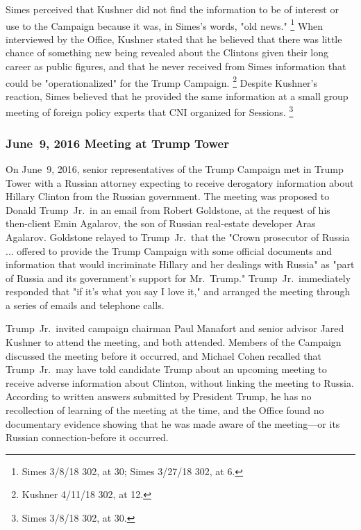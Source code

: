 Simes perceived that Kushner did not find the information to be of interest or use to the Campaign because it was, in Simes's words, "old news."%
\footnote{Simes 3/8/18 302, at 30;
Simes 3/27/18 302, at 6.}
When interviewed by the Office, Kushner stated that he believed that there was little chance of something new being revealed about the Clintons given their long career as public figures, and that he never received from Simes information that could be "operationalized" for the Trump Campaign.%
\footnote{Kushner 4/11/18 302, at 12.}
Despite Kushner's reaction, Simes believed that he provided the same information at a small group meeting of foreign policy experts that CNI organized for Sessions.%
\footnote{Simes 3/8/18 302, at 30.}

\subsubsection{June~9, 2016 Meeting at Trump Tower}

On June~9, 2016, senior representatives of the Trump Campaign met in Trump Tower with a Russian attorney expecting to receive derogatory information about Hillary Clinton from the Russian government.
The meeting was proposed to Donald Trump~Jr.\ in an email from Robert Goldstone, at the request of his then-client Emin Agalarov, the son of Russian real-estate developer Aras Agalarov.
Goldstone relayed to Trump~Jr.\ that the "Crown prosecutor of Russia ... offered to provide the Trump Campaign with some official documents and information that would incriminate Hillary and her dealings with Russia" as "part of Russia and its government's support for Mr.~Trump."
Trump~Jr.\ immediately responded that "if it's what you say I love it," and arranged the meeting through a series of emails and telephone calls.

Trump~Jr.\ invited campaign chairman Paul Manafort and senior advisor Jared Kushner to attend the meeting, and both attended.
Members of the Campaign discussed the meeting before it occurred, and Michael Cohen recalled that Trump~Jr.\ may have told candidate Trump about an upcoming meeting to receive adverse information about Clinton, without linking the meeting to Russia.
According to written answers submitted by President Trump, he has no recollection of learning of the meeting at the time, and the Office found no documentary evidence showing that he was made aware of the meeting---or its Russian connection-before it occurred.

